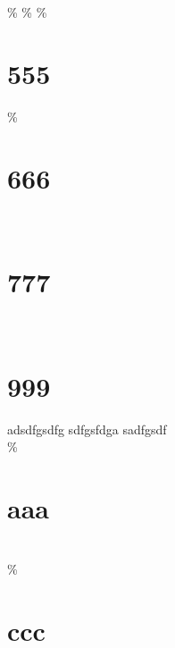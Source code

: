 \%%
\%%
\%\section{555}
\%\section{666}
\\\section{777}
\\\section{%
   999} adsdfgsdfg sdfgsfdga sadfgsdf
\\\%\section{aaa}
\\\%\section{%
   ccc}

